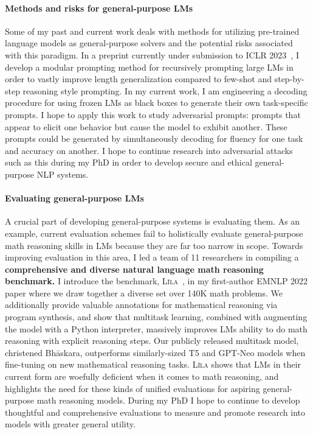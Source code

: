 \documentclass[11pt]{article}
\newcommand\lila{\textsc{L\={\i}la}\xspace}
\begin{document}
\paragraph{Methods and risks for general-purpose LMs}

Some of my past and current work 
deals with methods for utilizing pre-trained language models
as general-purpose solvers and the potential risks associated with this paradigm.
In a preprint currently under submission to ICLR 2023~\cite{Khot2022DecomposedPA},
I develop a modular prompting method for recursively prompting large LMs 
in order to vastly improve length generalization 
compared to few-shot and step-by-step reasoning style prompting.
In my current work, I am engineering a
decoding procedure for using frozen LMs as black boxes
to generate their own task-specific prompts.
I hope to apply this work
to study adversarial prompts:
prompts that appear to elicit one behavior 
but cause the model to exhibit another.
These prompts could be generated by simultaneously 
decoding for fluency for one task and accuracy on another.
I hope to continue research into adversarial attacks such as this 
during my PhD in order to
develop secure and ethical general-purpose NLP systems. 

\paragraph{Evaluating general-purpose LMs}
A crucial part of developing general-purpose systems is evaluating them.
As an example, 
current evaluation schemes fail to holistically evaluate 
general-purpose math reasoning skills in LMs
because they are far too narrow in scope.
Towards improving evaluation in this area, 
I led a team of 11 researchers in compiling a
\textbf{comprehensive and diverse natural language math reasoning benchmark.} 
I introduce the benchmark, \lila~\cite{Mishra2022Lila}, 
in my first-author EMNLP 2022 paper
where we draw together a diverse set over 140K math problems.
We additionally provide valuable annotations for mathematical reasoning via program synthesis, 
and show that multitask learning, 
combined with augmenting the model with a Python interpreter,
massively improves LMs ability to do math reasoning 
with explicit reasoning steps.
Our publicly released multitask model, christened Bh\=askara, 
outperforms similarly-sized T5 and GPT-Neo models
when fine-tuning on new mathematical reasoning tasks.
\lila shows that LMs 
in their current form 
are woefully deficient when it comes to math reasoning,
and highlights the need for these kinds of unified evaluations for 
aspiring general-purpose math reasoning models.
During my PhD I hope to continue to develop thoughtful and comprehensive evaluations 
to measure and promote research into models with greater general utility.
\end{document}
